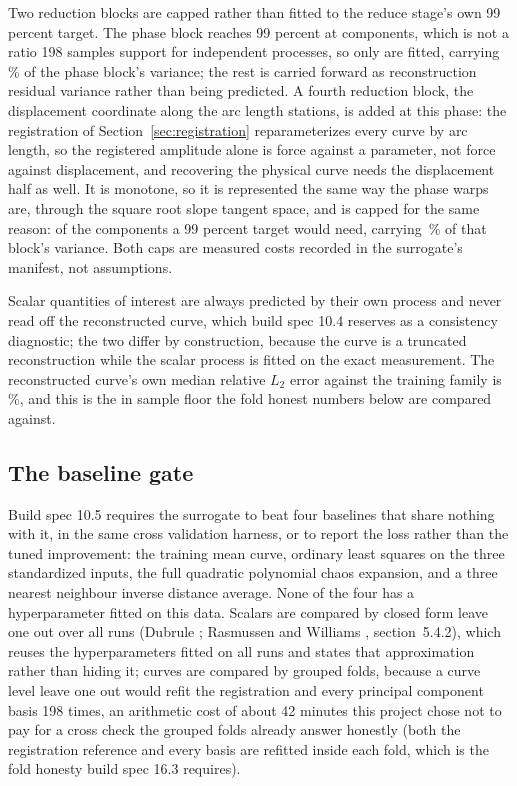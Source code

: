 \documentclass[11pt,a4paper]{article}
\begin{document}
Two reduction blocks are capped rather than fitted to the reduce stage's own 99 percent
target. The phase block reaches 99 percent at \PhaseComponentsNeeded{} components, which is
not a ratio 198 samples support for independent processes, so only
\SurrogateComponentsPhase{} are fitted, carrying \PhaseVarianceCarried\,\% of the phase
block's variance; the rest is carried forward as reconstruction residual variance rather than
being predicted. A fourth reduction block, the displacement coordinate along the arc length
stations, is added at this phase: the registration of Section~\ref{sec:registration}
reparameterizes every curve by arc length, so the registered amplitude alone is force against
a parameter, not force against displacement, and recovering the physical curve needs the
displacement half as well. It is monotone, so it is represented the same way the phase warps
are, through the square root slope tangent space, and is capped for the same reason:
\SurrogateComponentsDisplacement{} of the \DisplacementComponentsNeeded{} components a
99 percent target would need, carrying \DisplacementVarianceCarried\,\% of that block's
variance. Both caps are measured costs recorded in the surrogate's manifest, not assumptions.

Scalar quantities of interest are always predicted by their own process and never read off the
reconstructed curve, which build spec 10.4 reserves as a consistency diagnostic; the two
differ by construction, because the curve is a truncated reconstruction while the scalar
process is fitted on the exact measurement. The reconstructed curve's own median relative
$L_2$ error against the training family is \SurrogateForceReconMedian\,\%, and this is the in
sample floor the fold honest numbers below are compared against.

\subsection{The baseline gate}
\label{sec:baselines}
Build spec 10.5 requires the surrogate to beat four baselines that share nothing with it, in
the same cross validation harness, or to report the loss rather than the tuned improvement:
the training mean curve, ordinary least squares on the three standardized inputs, the full
quadratic polynomial chaos expansion, and a three nearest neighbour inverse distance average.
None of the four has a hyperparameter fitted on this data. Scalars are compared by closed form
leave one out over all \NValid{} runs (Dubrule \cite{dubrule1983}; Rasmussen and Williams
\cite{rasmussen2006}, section~5.4.2), which reuses the hyperparameters fitted on all runs and states that
approximation rather than hiding it; curves are compared by \ValidationFolds{} grouped folds,
because a curve level leave one out would refit the registration and every principal
component basis 198 times, an arithmetic cost of about 42 minutes this project chose not to
pay for a cross check the grouped folds already answer honestly (both the registration
reference and every basis are refitted inside each fold, which is the fold honesty build spec
16.3 requires).
\end{document}
